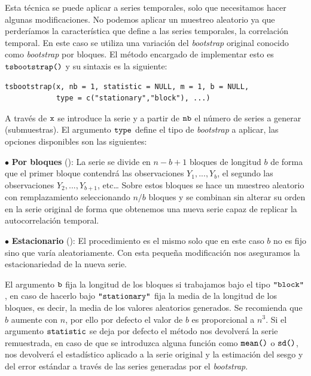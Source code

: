 Esta técnica se puede aplicar a series temporales, solo que necesitamos hacer algunas modificaciones. No podemos aplicar un muestreo aleatorio ya que perderíamos la característica que define a las series temporales, la correlación temporal. En este caso se utiliza una variación del \textit{bootstrap} original conocido como \textit{bootstrap} por bloques. El método encargado de implementar esto es $\verb!tsbootstrap()!$ y su sintaxis es la siguiente:
\begin{Verbatim}[fontsize=\footnotesize]
tsbootstrap(x, nb = 1, statistic = NULL, m = 1, b = NULL,
            type = c("stationary","block"), ...)
\end{Verbatim}

A través de $\verb!x!$ se introduce la serie y a partir de $\verb!nb!$ el número de series a generar (submuestras). El argumento $\verb!type!$ define el tipo de \textit{bootstrap} a aplicar, las opciones disponibles son las siguientes:
\begin{itemize*}
  \item[$\bullet$] \textbf{Por bloques} (): La serie se divide en  $n-b+1$ bloques de longitud $b$ de forma que el primer bloque contendrá las observaciones $Y_1,...,Y_b$, el segundo las observaciones $Y_2,...,Y_{b+1}$, etc… Sobre estos bloques se hace un muestreo aleatorio con remplazamiento seleccionando $n/b$ bloques y se combinan sin alterar su orden en la serie original de forma que obtenemos una nueva serie capaz de replicar la autocorrelación temporal.
  \item[$\bullet$] \textbf{Estacionario} (): El procedimiento es el mismo solo que en este caso $b$ no es fijo sino que varía aleatoriamente. Con esta pequeña modificación nos aseguramos la estacionariedad de la nueva serie.
\end{itemize*}

El argumento $\verb!b!$ fija la longitud de los bloques si trabajamos bajo el tipo $\verb!"block"!$, en caso de hacerlo bajo $\verb!"stationary"!$ fija la media de la longitud de los bloques, es decir, la media de los valores aleatorios generados. Se recomienda que $b$ aumente con $n$, por ello por defecto el valor de $b$ es proporcional a $n^3$. Si el argumento $\verb!statistic!$ se deja por defecto el método nos devolverá la serie remuestrada, en caso de que se introduzca alguna función como $\verb!mean()!$ o $\verb!sd()!$, nos devolverá el estadístico aplicado a la serie original y la estimación del sesgo y del error estándar a través de las series generadas por el \textit{bootstrap}.

